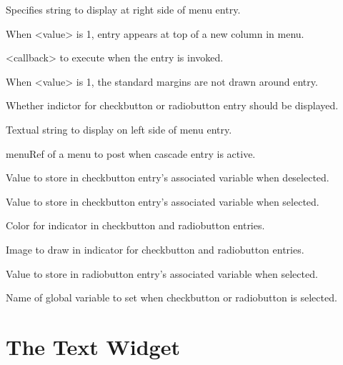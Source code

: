 \begin{enum}{1cm}

Specifies string to display at right side of menu entry.

When <value> is 1, entry appears at top of a new column in menu.

<callback> to execute when the entry is invoked.

When <value> is 1, the standard margins are not drawn around entry.

Whether indictor for checkbutton or radiobutton entry should be displayed.

Textual string to display on left side of menu entry.

menuRef of a menu to post when cascade entry is active.

Value to store in checkbutton entry's associated variable when deselected.

Value to store in checkbutton entry's associated variable when selected.

Color for indicator in checkbutton and radiobutton entries.

Image to draw in indicator for checkbutton and radiobutton entries.

Value to store in radiobutton entry's associated variable when selected.

Name of global variable to set when checkbutton or radiobutton is selected.

\end{enum}


\section{The Text Widget}


